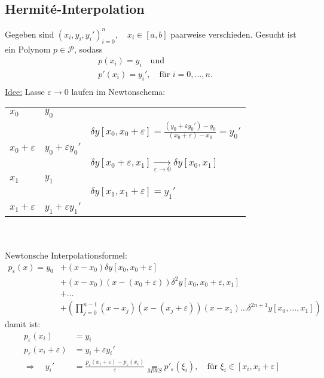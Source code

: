\documentclass[12pt]{article}
\theoremstyle{break}
\begin{document}
\subsection{Hermit\'{e}-Interpolation}

Gegeben sind $(x_i, y_i, y_i')_{i=0}^n, \quad x_i \in [a,b]$ paarweise verschieden. Gesucht ist ein Polynom $p \in \mathcal{P}$, sodass
\begin{align*}
&p(x_i) = y_i \quad \text{und } &\\
&p'(x_i) = y_i', \quad \text{für } i=0,...,n. &\\
\end{align*}
\underline{Idee:} Lasse $\varepsilon \rightarrow 0$ laufen im Newtonschema:

\begin{tabular}{lll}
 
$x_0$ & $y_0$\\
 & & $\delta y[x_0, x_0+\varepsilon] = \frac{(y_0 + \varepsilon y_0') - y_0}{(x_0 +\varepsilon) - x_0} = y_0'$\\
$x_0+\varepsilon$ & $y_0 + \varepsilon y_0'$\\
 & & $\delta y[x_0+\varepsilon, x_1] \underset{\varepsilon \rightarrow 0}{\rightarrow} \delta y[x_0,x_1]$\\
$x_1$ & $y_1$\\
 & & $\delta y[x_1, x_1+\varepsilon] = y_1'$\\
$x_1+\varepsilon$ & $y_1+\varepsilon y_1'$\\
 
\end{tabular} \\ \\
Newtonsche Interpolationsformel:
\begin{align*}
p_{\varepsilon}(x) = y_0 &+ (x-x_0) \delta y[x_0, x_0+\varepsilon] &\\
&+ (x-x_0)(x-(x_0 + \varepsilon)) \delta^2y[x_0, x_0 + \varepsilon, x_1] &\\
&+ \dots &\\
&+ \left( \prod_{j=0}^{n-1} (x-x_j)(x-(x_j + \varepsilon))(x-x_1) \dots \delta^{2n+1} y[x_0,\dots, x_1]\right)
\end{align*}
damit ist:
\begin{align*}
p_{\varepsilon}(x_i) &= y_i &\\
p_{\varepsilon}(x_i + \varepsilon) &= y_i + \varepsilon y_i' &\\
\Rightarrow \quad y_i' &= \frac{p_{\varepsilon}(x_i + \varepsilon) - p_{\varepsilon}(x_i)}{\varepsilon} \underset{MWS}{=} p'_{\varepsilon}(\xi_i), \quad \text{für } \xi_i \in [x_i, x_i+\varepsilon]
\end{align*}
\end{document}

